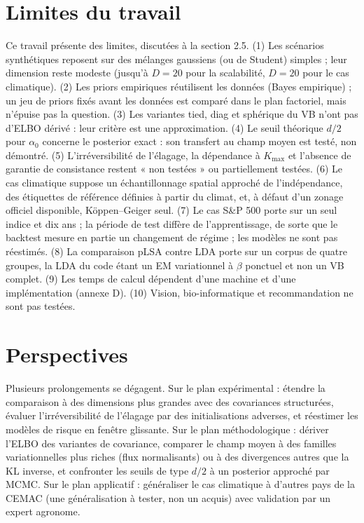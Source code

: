 \section*{Limites du travail}
Ce travail présente des limites, discutées à la section 2.5. (1) Les scénarios synthétiques reposent sur des mélanges gaussiens (ou de Student) simples ; leur dimension reste modeste (jusqu'à $D=20$ pour la scalabilité, $D=20$ pour le cas climatique). (2) Les priors empiriques réutilisent les données (Bayes empirique) ; un jeu de priors fixés avant les données est comparé dans le plan factoriel, mais n'épuise pas la question. (3) Les variantes tied, diag et sphérique du VB n'ont pas d'ELBO dérivé : leur critère est une approximation. (4) Le seuil théorique $d/2$ pour $\alpha_0$ concerne le posterior exact : son transfert au champ moyen est testé, non démontré. (5) L'irréversibilité de l'élagage, la dépendance à $K_{\max}$ et l'absence de garantie de consistance restent « non testées » ou partiellement testées. (6) Le cas climatique suppose un échantillonnage spatial approché de l'indépendance, des étiquettes de référence définies à partir du climat, et, à défaut d'un zonage officiel disponible, Köppen--Geiger seul. (7) Le cas S\&P 500 porte sur un seul indice et dix ans ; la période de test diffère de l'apprentissage, de sorte que le backtest mesure en partie un changement de régime ; les modèles ne sont pas réestimés. (8) La comparaison pLSA contre LDA porte sur un corpus de quatre groupes, la LDA du code étant un EM variationnel à $\beta$ ponctuel et non un VB complet. (9) Les temps de calcul dépendent d'une machine et d'une implémentation (annexe D). (10) Vision, bio-informatique et recommandation ne sont pas testées.

\section*{Perspectives}
Plusieurs prolongements se dégagent. Sur le plan expérimental : étendre la comparaison à des dimensions plus grandes avec des covariances structurées, évaluer l'irréversibilité de l'élagage par des initialisations adverses, et réestimer les modèles de risque en fenêtre glissante. Sur le plan méthodologique : dériver l'ELBO des variantes de covariance, comparer le champ moyen à des familles variationnelles plus riches (flux normalisants) ou à des divergences autres que la KL inverse, et confronter les seuils de type $d/2$ à un posterior approché par MCMC. Sur le plan applicatif : généraliser le cas climatique à d'autres pays de la CEMAC (une généralisation à tester, non un acquis) avec validation par un expert agronome.

